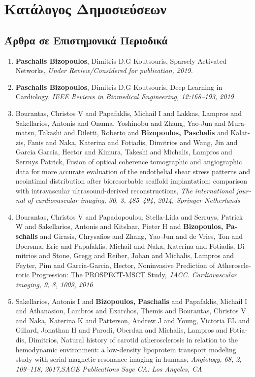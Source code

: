 \chapter{Κατάλογος Δημοσιεύσεων}
\section*{Άρθρα σε Επιστημονικά Περιοδικά}
\begin{enumerate}
	\item \textlatin{\textbf{Paschalis Bizopoulos}, Dimitris D.G Koutsouris, Sparsely Activated Networks, \textit{Under Review/Considered for publication, 2019.}}
	\item \textlatin{\textbf{Paschalis Bizopoulos}, Dimitris D.G Koutsouris, Deep Learning in Cardiology, \textit{IEEE Reviews in Biomedical Engineering, 12:168--193, 2019.}}
	\item \textlatin{Bourantas, Christos V and Papafaklis, Michail I and Lakkas, Lampros and Sakellarios, Antonis and Onuma, Yoshinobu and Zhang, Yao-Jun and Muramatsu, Takashi and Diletti, Roberto and \textbf{Bizopoulos, Paschalis} and Kalatzis, Fanis and Naka, Katerina and Fotiadis, Dimitrios and Wang, Jin and Garcia Garcia, Hector and Kimura, Takeshi and Michalis, Lampros and Serruys Patrick, Fusion of optical coherence tomographic and angiographic data for more accurate evaluation of the endothelial shear stress patterns and neointimal distribution after bioresorbable scaffold implantation: comparison with intravascular ultrasound-derived reconstructions, \textit{The international journal of cardiovascular imaging, 30, 3, 485--494, 2014, Springer Netherlands}}
	\item \textlatin{Bourantas, Christos V and Papadopoulou, Stella-Lida and Serruys, Patrick W and Sakellarios, Antonis and Kitslaar, Pieter H and \textbf{Bizopoulos, Paschalis} and Girasis, Chrysafios and Zhang, Yao-Jun and de Vries, Ton and Boersma, Eric and Papafaklis, Michail and Naka, Katerina and Fotiadis, Dimitrios and Stone, Gregg and Reiber, Johan and Michalis, Lampros and Feyter, Pim and Garcia-Garcia, Hector, Noninvasive Prediction of Atherosclerotic Progression: The PROSPECT-MSCT Study, \textit{JACC\@. Cardiovascular imaging, 9, 8, 1009, 2016}}
	\item \textlatin{Sakellarios, Antonis I and \textbf{Bizopoulos, Paschalis} and Papafaklis, Michail I and Athanasiou, Lambros and Exarchos, Themis and Bourantas, Christos V and Naka, Katerina K and Patterson, Andrew J and Young, Victoria EL and Gillard, Jonathan H and Parodi, Oberdan and Michalis, Lampros and Fotiadis, Dimitrios, Natural history of carotid atherosclerosis in relation to the hemodynamic environment: a low-density lipoprotein transport modeling study with serial magnetic resonance imaging in humans, \textit{Angiology, 68, 2, 109--118, 2017,SAGE Publications Sage CA\@: Los Angeles, CA}}
\end{enumerate}

